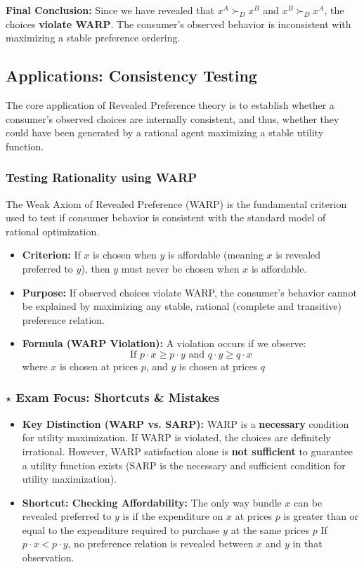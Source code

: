 \documentclass{article}
\begin{document}
\textbf{Final Conclusion:} Since we have revealed that $x^A \succ_D x^B$ and $x^B \succ_D x^A$, the choices \textbf{violate WARP}. The consumer's observed behavior is inconsistent with maximizing a stable preference ordering.

\subsection{Applications: Consistency Testing}

The core application of Revealed Preference theory is to establish whether a consumer's observed choices are internally consistent, and thus, whether they could have been generated by a rational agent maximizing a stable utility function.

\subsubsection*{Testing Rationality using WARP}

The Weak Axiom of Revealed Preference (WARP) is the fundamental criterion used to test if consumer behavior is consistent with the standard model of rational optimization.

\begin{itemize}
    \item \textbf{Criterion:} If $x$ is chosen when $y$ is affordable (meaning $x$ is revealed preferred to $y$), then $y$ must never be chosen when $x$ is affordable.
    \item \textbf{Purpose:} If observed choices violate WARP, the consumer's behavior cannot be explained by maximizing any stable, rational (complete and transitive) preference relation.
    \item \textbf{Formula (WARP Violation):} A violation occurs if we observe:
    \[\text{If } p \cdot x \geq p \cdot y \text{ and } q \cdot y \geq q \cdot x\]
    where $x$ is chosen at prices $p$, and $y$ is chosen at prices $q$
\end{itemize}

\subsubsection*{$\star$ Exam Focus: Shortcuts \& Mistakes}

\begin{itemize}
    \item \textbf{Key Distinction (WARP vs. SARP):} WARP is a \textbf{necessary} condition for utility maximization. If WARP is violated, the choices are definitely irrational. However, WARP satisfaction alone is \textbf{not sufficient} to guarantee a utility function exists (SARP is the necessary and sufficient condition for utility maximization).
    \item \textbf{Shortcut: Checking Affordability:} The only way bundle $x$ can be revealed preferred to $y$ is if the expenditure on $x$ at prices $p$ is greater than or equal to the expenditure required to purchase $y$ at the same prices $p$ If $p \cdot x < p \cdot y$, no preference relation is revealed between $x$ and $y$ in that observation.
\end{itemize}
\end{document}

